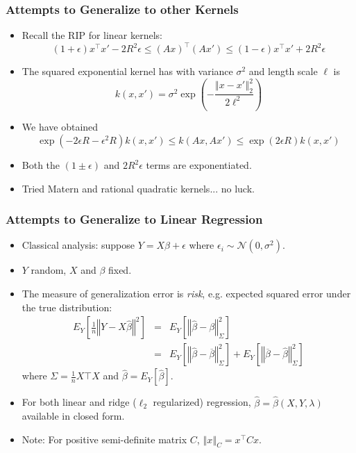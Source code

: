 \documentclass[aspectratio=34]{beamer}
\theoremstyle{plain}
\begin{document}
\begin{frame}
    \frametitle{Attempts to Generalize to other Kernels}
    \begin{itemize}
        \item Recall the RIP for linear kernels:
        \[
        (1+\epsilon)x^{\top}x'-2R^{2}\epsilon\leq\left(Ax\right)^{\top}\left(Ax'\right)\leq(1-\epsilon)x^{\top}x'+2R^{2}\epsilon
        \]
        \item The squared exponential kernel has with variance $\sigma^{2}$ and length scale $\ell$ is
        \begin{equation}
        k(x,x')=\sigma^{2}\exp\left(-\frac{\left\Vert x-x'\right\Vert _{2}^{2}}{2\ell^{2}}\right)\label{eq:kSE}
        \end{equation}
        \item We have obtained
        \begin{equation}
        \exp(-2\epsilon R-\epsilon^{2}R)k(x,x')\leq k(Ax,Ax')\leq\exp(2\epsilon R)k(x,x')\label{eq:exp-bound}
        \end{equation}
        \item Both the $(1\pm\epsilon)$ and $2R^2\epsilon$ terms are exponentiated.
        \item Tried Matern and rational quadratic kernels... no luck.
    \end{itemize}
\end{frame}

\begin{frame}
    \frametitle{Attempts to Generalize to Linear Regression}
    \begin{itemize}
        \item Classical analysis: suppose $Y = X\beta + \epsilon$ where $\epsilon_i \sim \mathcal{N}(0, \sigma^2)$.
        \item $Y$ random, $X$ and $\beta$ fixed.
        \item The measure of generalization error is \emph{risk}, e.g. expected squared error under the true distribution:
        \begin{eqnarray*}
        E_{Y}\left[\frac{1}{n}\left\Vert Y-X\widehat{\beta}\right\Vert ^{2}\right] & = & E_{Y}\left[\left\Vert \widehat{\beta}-\beta\right\Vert _{\Sigma}^{2}\right]\\
         & = & E_{Y}\left[\left\Vert \widehat{\beta}-\overline{\beta}\right\Vert _{\Sigma}^{2}\right] + E_{Y}\left[\left\Vert \overline{\beta}-\widehat{\beta}\right\Vert _{\Sigma}^{2}\right]
        \end{eqnarray*}
        where $\Sigma = \frac{1}{n} X\top X$ and $\widehat{\beta} = E_Y[\widehat{\beta}]$.
        \item For both linear and ridge ($\ell_2$ regularized) regression, $\widehat{\beta} = \widehat{\beta}(X, Y, \lambda)$  available in closed form.
        \item Note: For positive semi-definite matrix $C$, $\left\Vert x \right\Vert_C = x^\top C x$.
    \end{itemize}
\end{frame}
\end{document}
